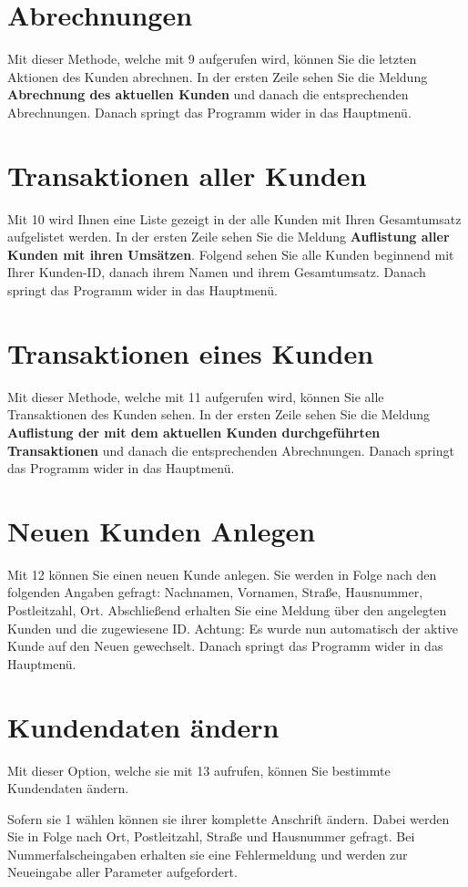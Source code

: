 ﻿\documentclass[a4paper,12pt,titlepage]{article}
\newcommand\enquote[1]{{\ttfamily \bfseries #1}}
\begin{document}
\section{Abrechnungen}
Mit dieser Methode, welche mit 9 aufgerufen wird, können Sie die letzten Aktionen des Kunden abrechnen.
In der ersten Zeile sehen Sie die Meldung \enquote{Abrechnung des aktuellen Kunden} und danach die entsprechenden Abrechnungen.
Danach springt das Programm wider in das Hauptmenü.

\section{Transaktionen aller Kunden}
Mit 10 wird Ihnen eine Liste gezeigt in der alle Kunden mit Ihren Gesamtumsatz aufgelistet werden.
In der ersten Zeile sehen Sie die Meldung \enquote{Auflistung aller Kunden mit ihren Umsätzen}.
Folgend sehen Sie alle Kunden beginnend mit Ihrer Kunden-ID, danach ihrem Namen und ihrem Gesamtumsatz.
Danach springt das Programm wider in das Hauptmenü.
\section{Transaktionen eines Kunden}
Mit dieser Methode, welche mit 11 aufgerufen wird, können Sie alle Transaktionen des Kunden sehen.
In der ersten Zeile sehen Sie die Meldung \enquote{Auflistung der mit dem aktuellen Kunden durchgeführten Transaktionen}
 und danach die entsprechenden Abrechnungen.
Danach springt das Programm wider in das Hauptmenü.
\section{Neuen Kunden Anlegen}
Mit 12 können Sie einen neuen Kunde anlegen.
Sie werden in Folge nach den folgenden Angaben gefragt: Nachnamen, Vornamen, Straße, Hausnummer, Postleitzahl, Ort.
Abschließend erhalten Sie eine Meldung über den angelegten Kunden und die zugewiesene ID.
Achtung: Es wurde nun automatisch der aktive Kunde auf den Neuen gewechselt.
Danach springt das Programm wider in das Hauptmenü.
\section{Kundendaten ändern}
Mit dieser Option, welche sie mit 13 aufrufen, können Sie bestimmte Kundendaten ändern.

Sofern sie 1 wählen können sie ihrer komplette Anschrift ändern.
Dabei werden Sie in Folge nach Ort, Postleitzahl, Straße und Hausnummer gefragt.
Bei Nummerfalscheingaben erhalten sie eine Fehlermeldung und werden zur Neueingabe aller Parameter aufgefordert.
\end{document}
